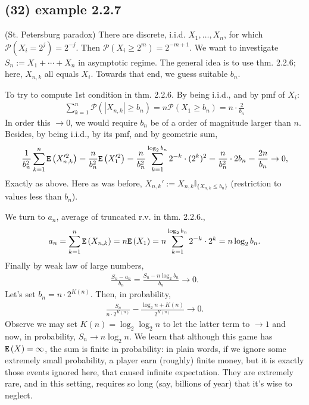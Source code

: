\documentclass[12pt]{article}
\newcommand\oo\infty%
\newcommand\F\frac%
\newcommand\M\cdot%
\newcommand{\Rb}[1]{ \left( #1 \right) }%
\newcommand{\BF}[1]{ \mathbb{#1} }%
\newcommand{\CF}[1]{ \mathcal{#1} }%
\newcommand{\Tw}[1]{\texttt{\textbf{#1}}}%
\newcommand{\EqGo}[1]{ \begin{gather*}{#1}\end{gather*} } %
\renewcommand{\P}[1]{ \CF{P} \Rb{#1} }%
\newcommand{\E}[1]{ \Tw{E}\Rb{#1} }%
\newcommand{\I}[1]{ \BF I_{\{#1\}} }%
\begin{document}
\subsection*{(32) example 2.2.7} (St. Petersburg paradox) There are discrete, i.i.d. \(X_1,\dotsc,X_n\), for which \(\P{X_i = 2^j} =2^{-j}\). 
Then \(\P{X_i \geq 2^m} = 2^{-m+1}\). 
We want to investigate \(S_n := X_1 +\dotsb+ X_n\) in asymptotic regime. 
The general idea is to use thm. 2.2.6; here, \(X_{n,k}\) all equals \(X_i\). 
Towards that end, we guess suitable \(b_n\). \par
To try to compute 1st condition in thm. 2.2.6. 
By being i.i.d., and by pmf of \(X_i\): \EqGo{
 \sum_{k=1}^n \P{|X_{n,k}| \geq b_n}
 = n \P{X_1 \geq b_n}
 = n \M \F{2}{b_n}
} In order this \(\to 0\), we would require \(b_n\) be of a order of magnitude larger than \(n\). 
Besides, by being i.i.d., by its pmf, and by geometric sum, \EqGo{
 \F{1}{b_n^2} \sum_{k=1}^n \E{X_{n,k}'^2}
 = \F{n}{b_n^2} \E{X_1'^2}
 = \F{n}{b_n^2} \sum_{k=1}^{\log_2 b_n} 2^{-k} \M (2^k)^2 
 = \F{n}{b_n^2} \M 2b_n
 = \F{2n}{b_n}
 \to 0, 
} Exactly as above. Here as was before, \(X_{n,k}' := X_{n,k} \I{X_{n,k} \leq b_n}\) (restriction to values less than \(b_n\)). \par
We turn to \(a_n\), average of truncated r.v. in thm. 2.2.6., \EqGo{
 a_n
 = \sum_{k=1}^n \E{X_{n,k}}
 = n \E{X_1}
 = n \sum_{k=1}^{\log_2 b_n} 2^{-k} \M 2^k
 = n \log_2 b_n.  
} Finally by weak law of large numbers, \EqGo{
 \F{S_n-a_n}{b_n}
 = \F{S_n - n \log_2 b_n}{b_n}
 \to 0.
} Let's set \(b_n = n \M 2^{K(n)}\). Then, in probability, \EqGo{
 \F{S_n}{n \M 2^{K(n)}} - \F{\log_2 n +K(n)}{2^{K(n)}} \to 0.
} Observe we may set \(K(n) = \log_2 \log_2 n\) to let the latter term to \(\to 1\) and now, in probability, \(S_n \to n \log_2 n\). 
We learn that although this game has \(\E{X} =\oo\), the sum is finite in probability: 
in plain words, if we ignore some extremely small probability, a player earn (roughly) finite money, but it is exactly those events ignored here, that caused infinite expectation. 
They are extremely rare, and in this setting, requires so long (say, billions of year) that it's wise to neglect. 
\end{document}
